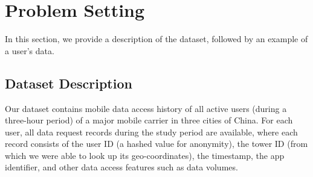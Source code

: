 \section{Problem Setting}\label{data}

In this section, we provide a description of the dataset,
followed by an example of a user's data.

\subsection{Dataset Description}

Our dataset contains mobile data access history of all active users (during a three-hour period)
of a major mobile carrier in three cities of China.
For each user, all data request records during the study period are available,
where each record consists of the user ID (a hashed value for anonymity), 
the tower ID (from which we were able to look up its geo-coordinates), 
the timestamp, 
the app identifier, 
and other data access features such as data volumes.


